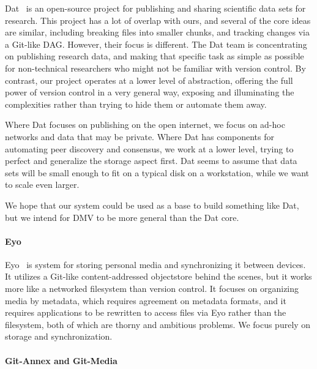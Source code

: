 Dat~\cite{dat_homepage} is an open-source project for publishing and sharing scientific data sets for research.
This project has a lot of overlap with ours, and several of the core ideas are similar, including breaking files into smaller chunks, and tracking changes via a Git-like \gls{DAG}.
However, their focus is different.
The Dat team is concentrating on publishing research data, and making that specific task as simple as possible for non-technical researchers who might not be familiar with version control.
By contrast, our project operates at a lower level of abstraction, offering the full power of version control in a very general way, exposing and illuminating the complexities rather than trying to hide them or automate them away.

Where Dat focuses on publishing on the open internet, we focus on ad-hoc networks and data that may be private.
Where Dat has components for automating peer discovery and consensus, we work at a lower level, trying to perfect and generalize the storage aspect first.
Dat seems to assume that data sets will be small enough to fit on a typical disk on a workstation, while we want to scale even larger.

We hope that our system could be used as a base to build something like Dat, but we intend for \gls{DMV} to be more general than the Dat core.


\paragraph{Eyo}

Eyo~\cite{Strauss:2011:EDP:2002181.2002216} is system for storing personal media and synchronizing it between devices.
It utilizes a Git-like content-addressed \gls{objectstore} behind the scenes, but it works more like a networked filesystem than version control.
It focuses on organizing media by metadata, which requires agreement on metadata formats, and it requires applications to be rewritten to access files via Eyo rather than the filesystem, both of which are thorny and ambitious problems.
We focus purely on storage and synchronization.


\paragraph{Git-Annex and Git-Media}

